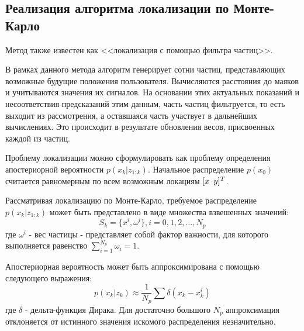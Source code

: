 \subsection{Реализация алгоритма локализации по Монте-Карло}

Метод также известен как <<локализация с помощью фильтра частиц>>.

В рамках данного метода алгоритм генерирует сотни частиц, представляющих возможные будущие положения пользователя. Вычисляются расстояния до маяков и учитываются значения их сигналов. На основании этих актуальных показаний и несоответствия предсказаний этим данным, часть частиц фильтруется, то есть выходит из рассмотрения, а оставшаяся часть участвует в дальнейших вычислениях. Это происходит в результате обновления весов, присвоенных каждой из частиц.

Проблему локализации можно сформулировать как проблему определения апостериорной вероятности  $p(x_k | z_{1:k})$. Начальное распределение $p(x_0)$ считается равномерным по всем возможным локациям $[x \enskip y]^T$.

Рассматривая локализацию по Монте-Карло, требуемое распределение \\$p(x_k | z_{1:k})$ может быть представлено в виде множества взвешенных значений:
\[
    S_k = \{ x^i, \omega^i \}, i = 0,1,2,...,N_p
\]
где $\omega^i$ - вес частицы - представляет собой фактор важности, для которого выполняется равенство $\sum_{i=1}^{N_p} \omega_i = 1$. 

Апостериорная вероятность может быть аппроксимирована с помощью следующего выражения:
\[
    p(x_k | z_k) \approx \frac{1}{N_p} \sum \delta (x_k - x_k^i)
\]
где $\delta$ - дельта-функция Дирака. Для достаточно большого $N_p$ аппроксимация отклоняется от истинного значения искомого распределения незначительно.

